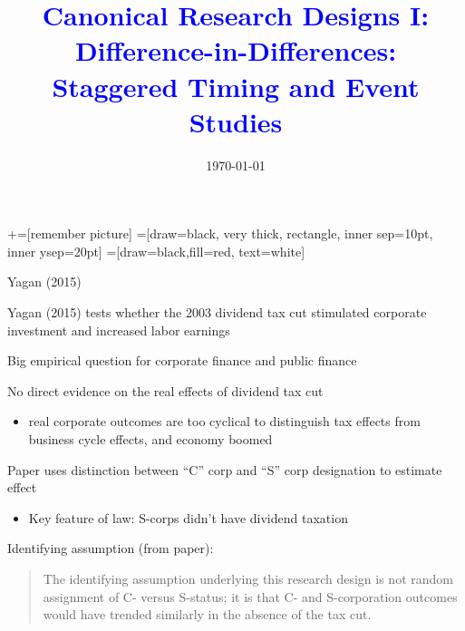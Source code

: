 \documentclass[notes,11pt, aspectratio=169]{beamer}
\title[]{\textcolor{blue}{Canonical Research Designs I:\\ Difference-in-Differences:\\ Staggered Timing and Event Studies}}
\author[PGP]{}
\institute[FRBNY]{\small{\begin{tabular}{c}
  Paul Goldsmith-Pinkham  \\
\end{tabular}}}
\date{\today}
\newenvironment{wideitemize}{\itemize\addtolength{\itemsep}{10pt}}{\enditemize}
\begin{document}
\newcommand\marktopleft[1]{%
	\tikz[overlay,remember picture]
	\node (marker-#1-a) at (-.3em,.3em) {};%
}
\newcommand\markbottomright[2]{%
	\tikz[overlay,remember picture]
	\node (marker-#1-b) at (0em,0em) {};%
}
+=[remember picture]
 =[draw=black, very thick, rectangle, inner sep=10pt, inner ysep=20pt]
 =[draw=black,fill=red, text=white]

\begin{frame}
	\maketitle
\end{frame}


\begin{frame}{Yagan (2015)}
	\begin{wideitemize}
		\item Yagan (2015) tests whether the 2003 dividend tax cut
		stimulated corporate investment and increased labor earnings
		\item Big empirical question for corporate  finance and public finance
		\item No direct evidence on the real effects of dividend tax cut
		\begin{itemize}
			\item real corporate outcomes are too cyclical to distinguish tax
			      effects from business cycle effects, and economy boomed
		\end{itemize}
		\item Paper uses distinction between ``C'' corp and ``S'' corp designation to estimate effect
		\begin{itemize}
			\item Key feature of law: S-corps didn't have dividend taxation
		\end{itemize}
		\item Identifying assumption (from paper):
		\begin{quote}
			The identifying assumption underlying this research design is
			not random assignment of C- versus S-status; it is that C- and
			S-corporation outcomes would have trended similarly in the
			absence of the tax cut.
		\end{quote}
	\end{wideitemize}
\end{frame}
\end{document}
